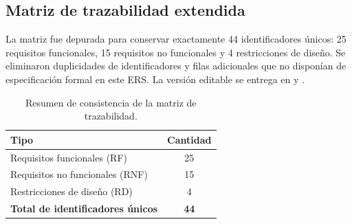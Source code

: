 \documentclass[11pt,a4paper,twoside]{article}
\begin{document}
\subsection{Matriz de trazabilidad extendida}
La matriz fue depurada para conservar exactamente 44 identificadores únicos: 25 requisitos funcionales, 15 requisitos no funcionales y 4 restricciones de diseño. Se eliminaron duplicidades de identificadores y filas adicionales que no disponían de especificación formal en este ERS. La versión editable se entrega en  y .

\begin{table}[H]
\centering
\small
\begin{tabular}{lc}
\toprule Tipo & Cantidad \\ \midrule
Requisitos funcionales (RF) & 25 \\
Requisitos no funcionales (RNF) & 15 \\
Restricciones de diseño (RD) & 4 \\ \midrule
\textbf{Total de identificadores únicos} & \textbf{44} \\
\bottomrule
\end{tabular}
\caption{Resumen de consistencia de la matriz de trazabilidad.}
\end{table}
\end{document}
